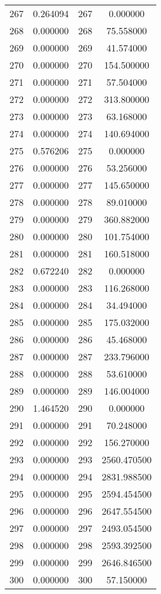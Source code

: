 \documentclass[12pt]{article}
\begin{document}
\begin{longtable}{@{}cccc@{}}
267 & 0.264094 & 267 & 0.000000 \\
268 & 0.000000 & 268 & 75.558000 \\
269 & 0.000000 & 269 & 41.574000 \\
270 & 0.000000 & 270 & 154.500000 \\
271 & 0.000000 & 271 & 57.504000 \\
272 & 0.000000 & 272 & 313.800000 \\
273 & 0.000000 & 273 & 63.168000 \\
274 & 0.000000 & 274 & 140.694000 \\
275 & 0.576206 & 275 & 0.000000 \\
276 & 0.000000 & 276 & 53.256000 \\
277 & 0.000000 & 277 & 145.650000 \\
278 & 0.000000 & 278 & 89.010000 \\
279 & 0.000000 & 279 & 360.882000 \\
280 & 0.000000 & 280 & 101.754000 \\
281 & 0.000000 & 281 & 160.518000 \\
282 & 0.672240 & 282 & 0.000000 \\
283 & 0.000000 & 283 & 116.268000 \\
284 & 0.000000 & 284 & 34.494000 \\
285 & 0.000000 & 285 & 175.032000 \\
286 & 0.000000 & 286 & 45.468000 \\
287 & 0.000000 & 287 & 233.796000 \\
288 & 0.000000 & 288 & 53.610000 \\
289 & 0.000000 & 289 & 146.004000 \\
290 & 1.464520 & 290 & 0.000000 \\
291 & 0.000000 & 291 & 70.248000 \\
292 & 0.000000 & 292 & 156.270000 \\
293 & 0.000000 & 293 & 2560.470500 \\
294 & 0.000000 & 294 & 2831.988500 \\
295 & 0.000000 & 295 & 2594.454500 \\
296 & 0.000000 & 296 & 2647.554500 \\
297 & 0.000000 & 297 & 2493.054500 \\
298 & 0.000000 & 298 & 2593.392500 \\
299 & 0.000000 & 299 & 2646.846500 \\
300 & 0.000000 & 300 & 57.150000 \\

\end{longtable}
\end{document}
